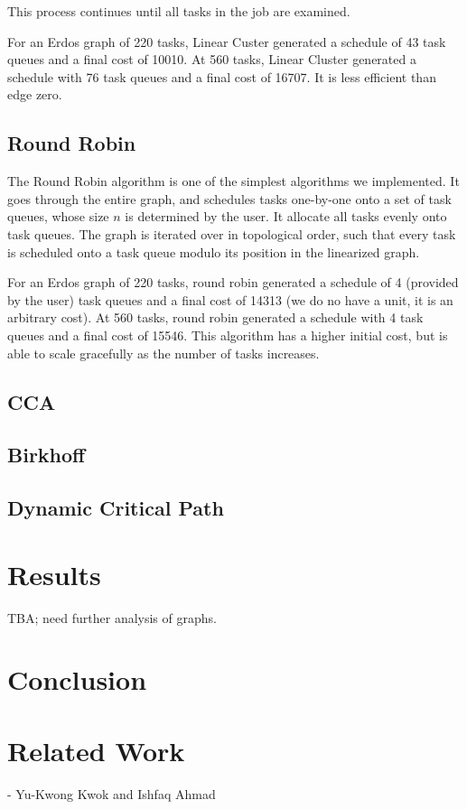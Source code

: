\documentclass[11pt, oneside]{article}   	%
\begin{document}
This process continues until all tasks in the job are examined.

For an Erdos graph of 220 tasks, Linear Custer generated a schedule of 43 task queues and a final cost of 10010. At 560 tasks, Linear Cluster generated a schedule with 76 task queues and a final cost of 16707. It is less efficient than edge zero.

\subsection{Round Robin}

The Round Robin algorithm is one of the simplest algorithms we implemented. It goes through the entire graph, and schedules tasks one-by-one onto a set of task queues, whose size $n$ is determined by the user. It allocate all tasks evenly onto task queues. The graph is iterated over in topological order, such that every task is scheduled onto a task queue modulo its position in the linearized graph.

For an Erdos graph of 220 tasks, round robin generated a schedule of 4 (provided by the user) task queues and a final cost of 14313 (we do no have a unit, it is an arbitrary cost). At 560 tasks, round robin generated a schedule with 4 task queues and a final cost of 15546. This algorithm has a higher initial cost, but is able to scale gracefully as the number of tasks increases.

\subsection{CCA}
\subsection{Birkhoff}
\subsection{Dynamic Critical Path}

\section{Results}

TBA; need further analysis of graphs.

\section{Conclusion}

\section{Related Work}

- Yu-Kwong Kwok and Ishfaq Ahmad
\end{document}
